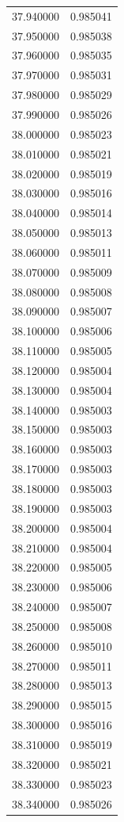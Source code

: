 \begin{tabular}{rr}
37.940000 & 0.985041 \\
37.950000 & 0.985038 \\
37.960000 & 0.985035 \\
37.970000 & 0.985031 \\
37.980000 & 0.985029 \\
37.990000 & 0.985026 \\
38.000000 & 0.985023 \\
38.010000 & 0.985021 \\
38.020000 & 0.985019 \\
38.030000 & 0.985016 \\
38.040000 & 0.985014 \\
38.050000 & 0.985013 \\
38.060000 & 0.985011 \\
38.070000 & 0.985009 \\
38.080000 & 0.985008 \\
38.090000 & 0.985007 \\
38.100000 & 0.985006 \\
38.110000 & 0.985005 \\
38.120000 & 0.985004 \\
38.130000 & 0.985004 \\
38.140000 & 0.985003 \\
38.150000 & 0.985003 \\
38.160000 & 0.985003 \\
38.170000 & 0.985003 \\
38.180000 & 0.985003 \\
38.190000 & 0.985003 \\
38.200000 & 0.985004 \\
38.210000 & 0.985004 \\
38.220000 & 0.985005 \\
38.230000 & 0.985006 \\
38.240000 & 0.985007 \\
38.250000 & 0.985008 \\
38.260000 & 0.985010 \\
38.270000 & 0.985011 \\
38.280000 & 0.985013 \\
38.290000 & 0.985015 \\
38.300000 & 0.985016 \\
38.310000 & 0.985019 \\
38.320000 & 0.985021 \\
38.330000 & 0.985023 \\
38.340000 & 0.985026 \\

\end{tabular}
